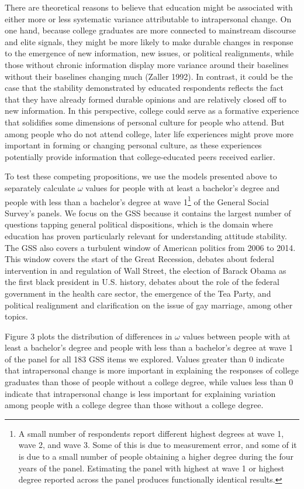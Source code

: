 \documentclass[
  12pt,
]{article}
\begin{document}
There are theoretical reasons to believe that education might be
associated with either more or less systematic variance attributable to
intrapersonal change. On one hand, because college graduates are more
connected to mainstream discourse and elite signals, they might be more
likely to make durable changes in response to the emergence of new
information, new issues, or political realignments, while those without
chronic information display more variance around their baselines without
their baselines changing much (Zaller 1992). In contrast, it could be
the case that the stability demonstrated by educated respondents
reflects the fact that they have already formed durable opinions and are
relatively closed off to new information. In this perspective, college
could serve as a formative experience that solidifies some dimensions of
personal culture for people who attend. But among people who do not
attend college, later life experiences might prove more important in
forming or changing personal culture, as these experiences potentially
provide information that college-educated peers received earlier.

To test these competing propositions, we use the models presented above
to separately calculate \(\omega\) values for people with at least a
bachelor's degree and people with less than a bachelor's degree at wave
1\footnote{A small number of respondents report different highest
  degrees at wave 1, wave 2, and wave 3. Some of this is due to
  measurement error, and some of it is due to a small number of people
  obtaining a higher degree during the four years of the panel.
  Estimating the panel with highest at wave 1 or highest degree reported
  across the panel produces functionally identical results.} of the
General Social Survey's panels. We focus on the GSS because it contains
the largest number of questions tapping general political dispositions,
which is the domain where education has proven particularly relevant for
understanding attitude stability. The GSS also covers a turbulent window
of American politics from 2006 to 2014. This window covers the start of
the Great Recession, debates about federal intervention in and
regulation of Wall Street, the election of Barack Obama as the first
black president in U.S. history, debates about the role of the federal
government in the health care sector, the emergence of the Tea Party,
and political realignment and clarification on the issue of gay
marriage, among other topics.

Figure 3 plots the distribution of differences in \(\omega\) values
between people with at least a bachelor's degree and people with less
than a bachelor's degree at wave 1 of the panel for all 183 GSS items we
explored. Values greater than 0 indicate that intrapersonal change is
more important in explaining the responses of college graduates than
those of people without a college degree, while values less than 0
indicate that intrapersonal change is less important for explaining
variation among people with a college degree than those without a
college degree.
\end{document}
